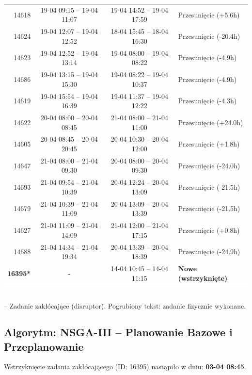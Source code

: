 \begin{table}[htbp]
\begin{tabular}{|r|c|c|l|}
14618 & 19-04 09:15 -- 19-04 11:07 & 19-04 14:52 -- 19-04 17:59 & Przesunięcie (+5.6h) \\ 
14624 & 19-04 12:07 -- 19-04 12:52 & 18-04 15:45 -- 18-04 16:30 & Przesunięcie (-20.4h) \\ 
14623 & 19-04 12:52 -- 19-04 13:14 & 19-04 08:00 -- 19-04 08:22 & Przesunięcie (-4.9h) \\ 
14686 & 19-04 13:15 -- 19-04 15:30 & 19-04 08:22 -- 19-04 10:37 & Przesunięcie (-4.9h) \\ 
14619 & 19-04 15:54 -- 19-04 16:39 & 19-04 11:37 -- 19-04 12:22 & Przesunięcie (-4.3h) \\ 
14622 & 20-04 08:00 -- 20-04 08:45 & 21-04 08:00 -- 21-04 11:00 & Przesunięcie (+24.0h) \\ 
14605 & 20-04 08:45 -- 20-04 20:45 & 20-04 10:30 -- 20-04 12:00 & Przesunięcie (+1.8h) \\ 
14647 & 21-04 08:00 -- 21-04 09:30 & 20-04 08:00 -- 20-04 09:30 & Przesunięcie (-24.0h) \\ 
14693 & 21-04 09:54 -- 21-04 10:39 & 20-04 12:24 -- 20-04 13:09 & Przesunięcie (-21.5h) \\ 
14679 & 21-04 10:39 -- 21-04 11:09 & 20-04 13:09 -- 20-04 13:39 & Przesunięcie (-21.5h) \\ 
14627 & 21-04 11:09 -- 21-04 14:09 & 21-04 12:00 -- 21-04 17:15 & Przesunięcie (+0.8h) \\ 
14688 & 21-04 14:34 -- 21-04 19:34 & 20-04 13:39 -- 20-04 18:39 & Przesunięcie (-24.9h) \\ 
\hline
\textbf{16395*} & - & 14-04 10:45 -- 14-04 11:15 & \textbf{Nowe (wstrzyknięte)} \\ 
\hline
\end{tabular}
\\ {\footnotesize * -- Zadanie zakłócające (disruptor). Pogrubiony tekst: zadanie fizycznie wykonane.}
\end{table}

\vspace{0.8cm}
\subsection{Algorytm: NSGA-III -- Planowanie Bazowe i Przeplanowanie}

Wstrzyknięcie zadania zakłócającego (ID: 16395) nastąpiło w dniu: \textbf{03-04 08:45}.

